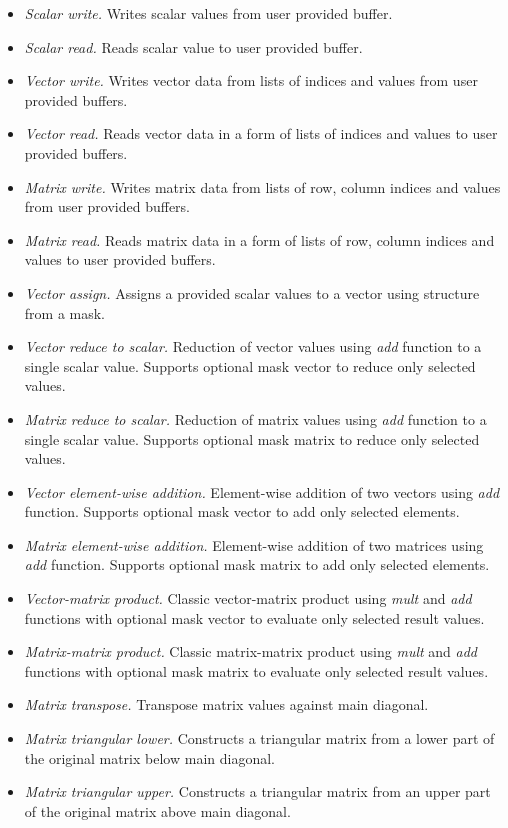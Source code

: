 \begin{itemize}
    \item \textit{Scalar write.} Writes scalar values from user provided buffer.
    \item \textit{Scalar read.} Reads scalar value to user provided buffer.
    \item \textit{Vector write.} Writes vector data from lists of indices and values from user provided buffers.
    \item \textit{Vector read.} Reads vector data in a form of lists of indices and values to user provided buffers.
    \item \textit{Matrix write.} Writes matrix data from lists of row, column indices and values from user provided buffers.
    \item \textit{Matrix read.} Reads matrix data in a form of lists of row, column indices and values to user provided buffers.
    \item \textit{Vector assign.} Assigns a provided scalar values to a vector using structure from a mask. 
    \item \textit{Vector reduce to scalar.} Reduction of vector values using \textit{add} function to a single scalar value. Supports optional mask vector to reduce only selected values.
    \item \textit{Matrix reduce to scalar.} Reduction of matrix values using \textit{add} function to a single scalar value. Supports optional mask matrix to reduce only selected values.
    \item \textit{Vector element-wise addition.} Element-wise addition of two vectors using \textit{add} function. Supports optional mask vector to add only selected elements. 
    \item \textit{Matrix element-wise addition.} Element-wise addition of two matrices using \textit{add} function. Supports optional mask matrix to add only selected elements. 
    \item \textit{Vector-matrix product.} Classic vector-matrix product using \textit{mult} and \textit{add} functions with optional mask vector to evaluate only selected result values.
    \item \textit{Matrix-matrix product.} Classic matrix-matrix product using \textit{mult} and \textit{add} functions with optional mask matrix to evaluate only selected result values.
    \item \textit{Matrix transpose.} Transpose matrix values against main diagonal. 
    \item \textit{Matrix triangular lower.} Constructs a triangular matrix from a lower part of the original matrix below main diagonal.
    \item \textit{Matrix triangular upper.} Constructs a triangular matrix from an upper part of the original matrix above main diagonal.
\end{itemize}


